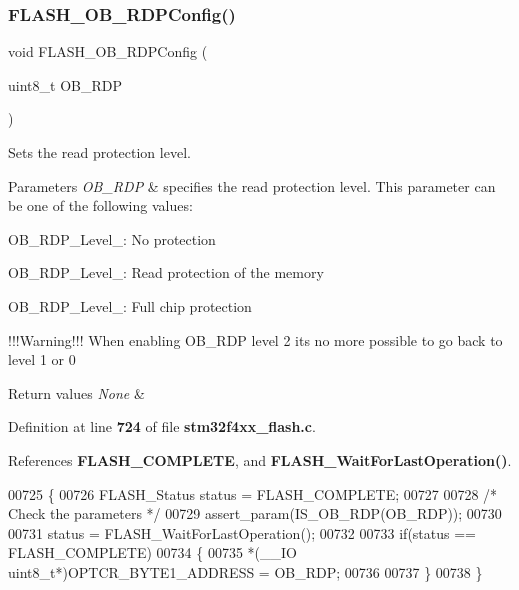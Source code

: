 \subsubsection{F\+L\+A\+S\+H\+\_\+\+O\+B\+\_\+\+R\+D\+P\+Config()}
{\footnotesize\ttfamily void F\+L\+A\+S\+H\+\_\+\+O\+B\+\_\+\+R\+D\+P\+Config (\begin{DoxyParamCaption}\item[{uint8\+\_\+t}]{O\+B\+\_\+\+R\+DP }\end{DoxyParamCaption})}



Sets the read protection level. 


\begin{DoxyParams}{Parameters}
{\em O\+B\+\_\+\+R\+DP} & specifies the read protection level. This parameter can be one of the following values\+: \begin{DoxyItemize}
\item O\+B\+\_\+\+R\+D\+P\+\_\+\+Level\+\_\+: No protection \item O\+B\+\_\+\+R\+D\+P\+\_\+\+Level\+\_\+: Read protection of the memory \item O\+B\+\_\+\+R\+D\+P\+\_\+\+Level\+\_\+: Full chip protection\end{DoxyItemize}
!!!\+Warning!!! When enabling O\+B\+\_\+\+R\+DP level 2 it\textquotesingle{}s no more possible to go back to level 1 or 0\\
\hline
\end{DoxyParams}

\begin{DoxyRetVals}{Return values}
{\em None} & \\
\hline
\end{DoxyRetVals}


Definition at line \textbf{ 724} of file \textbf{ stm32f4xx\+\_\+flash.\+c}.



References \textbf{ F\+L\+A\+S\+H\+\_\+\+C\+O\+M\+P\+L\+E\+TE}, and \textbf{ F\+L\+A\+S\+H\+\_\+\+Wait\+For\+Last\+Operation()}.


\begin{DoxyCode}
00725 \{
00726   FLASH_Status status = FLASH_COMPLETE;
00727 
00728   \textcolor{comment}{/* Check the parameters */}
00729   assert_param(IS_OB_RDP(OB\_RDP));
00730 
00731   status = FLASH_WaitForLastOperation();
00732 
00733   \textcolor{keywordflow}{if}(status == FLASH_COMPLETE)
00734   \{
00735     *(\_\_IO uint8\_t*)OPTCR_BYTE1_ADDRESS = OB\_RDP;
00736 
00737   \}
00738 \}
\end{DoxyCode}
\mbox{\label{group__FLASH__Group3_ga518d6e3bbba2adf1523e8454f62348e9}} 
